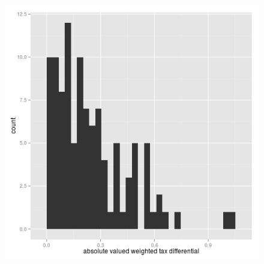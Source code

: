 \documentclass[12pt,a4paper]{article}
\begin{document}
\begin{landscape}

\end{landscape}
\restoregeometry



\begin{landscape}

\end{landscape}
\restoregeometry

%





%


%






\begin{landscape}

\end{landscape}


%



\begin{figure}[h]\label{weightedtax}
    \centering
    \includegraphics[scale = 0.5]{../analysis/output/_--_weightedtax.png}
\end{figure}





\end{document}

